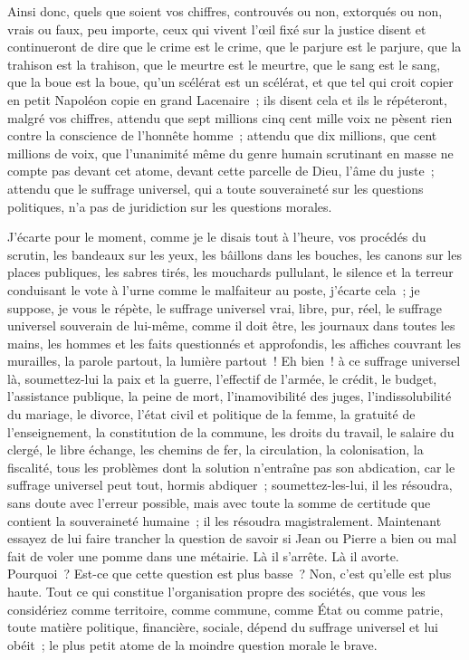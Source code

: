 \documentclass[french,twoside]{book} %
\begin{document}
\noindent Ainsi donc, quels que soient vos chiffres, controuvés ou non, extorqués ou non, vrais ou faux, peu importe, ceux qui vivent l’œil fixé sur la justice disent et continueront de dire que le crime est le crime, que le parjure est le parjure, que la trahison est la trahison, que le meurtre est le meurtre, que le sang est le sang, que la boue est la boue, qu’un scélérat est un scélérat, et que tel qui croit copier en petit Napoléon copie en grand Lacenaire ; ils disent cela et ils le répéteront, malgré vos chiffres, attendu que sept millions cinq cent mille voix ne pèsent rien contre la conscience de l’honnête homme ; attendu que dix millions, que cent millions de voix, que l’unanimité même du genre humain scrutinant en masse ne compte pas devant cet atome, devant cette parcelle de Dieu, l’âme du juste ; attendu que le suffrage universel, qui a toute souveraineté sur les questions politiques, n’a pas de juridiction sur les questions morales.\par
J’écarte pour le moment, comme je le disais tout à l’heure, vos procédés du scrutin, les bandeaux sur les yeux, les bâillons dans les bouches, les canons sur les places publiques, les sabres tirés, les mouchards pullulant, le silence et la terreur conduisant le vote à l’urne comme le malfaiteur au poste, j’écarte cela ; je suppose, je vous le répète, le suffrage universel vrai, libre, pur, réel, le suffrage universel souverain de lui-même, comme il doit être, les journaux dans toutes les mains, les hommes et les faits questionnés et approfondis, les affiches couvrant les murailles, la parole partout, la lumière partout ! Eh bien ! à ce suffrage universel là, soumettez-lui la paix et la guerre, l’effectif de l’armée, le crédit, le budget, l’assistance publique, la peine de mort, l’inamovibilité des juges, l’indissolubilité du mariage, le divorce, l’état civil et politique de la femme, la gratuité de l’enseignement, la constitution de la commune, les droits du travail, le salaire du clergé, le libre échange, les chemins de fer, la circulation, la colonisation, la fiscalité, tous les problèmes dont la solution n’entraîne pas son abdication, car le suffrage universel peut tout, hormis abdiquer ; soumettez-les-lui, il les résoudra, sans doute avec l’erreur possible, mais avec toute la somme de certitude que contient la souveraineté humaine ; il les résoudra magistralement. Maintenant essayez de lui faire trancher la question de savoir si Jean ou Pierre a bien ou mal fait de voler une pomme dans une métairie. Là il s’arrête. Là il avorte. Pourquoi ? Est-ce que cette question est plus basse ? Non, c’est qu’elle est plus haute. Tout ce qui constitue l’organisation propre des sociétés, que vous les considériez comme territoire, comme commune, comme État ou comme patrie, toute matière politique, financière, sociale, dépend du suffrage universel et lui obéit ; le plus petit atome de la moindre question morale le brave.\par
\end{document}
